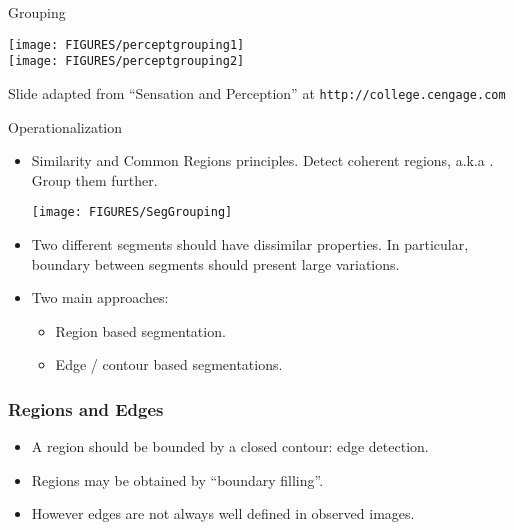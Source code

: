 \documentclass[9pt]{beamer}
\newcommand{\myemph}[1]{{\color{blue}{#1}}}
\begin{document}
\begin{frame}[t]{Grouping}
  \begin{center}
    \texttt{[image: FIGURES/perceptgrouping1]}\\
    \texttt{[image: FIGURES/perceptgrouping2]}\\
  \end{center}
  \vfill
  {\fontsize{6}{6}\selectfont Slide adapted from ``Sensation and Perception'' at \texttt{http://college.cengage.com}}
\end{frame}

\begin{frame}[t]{Operationalization}
  \begin{itemize}
  \item Similarity and Common Regions principles. Detect coherent regions, a.k.a \myemph{segments}. Group them further.
    \begin{center}
      \texttt{[image: FIGURES/SegGrouping]}
    \end{center}
  \item Two different segments should have dissimilar properties. In
    particular, boundary between segments should present large
    variations.\vfill
  \item Two main approaches: \vfill
    \begin{itemize}
    \item Region based segmentation. \vfill
    \item Edge / contour based segmentations.\vfill
    \end{itemize}
  \end{itemize}
\end{frame}




\begin{frame}
  \frametitle{Regions and Edges}
  \begin{itemize}
  \item A region should be bounded by a closed contour: edge
    detection.
  \item Regions may be obtained by ``boundary filling''.\vfill
  \item However edges are not always well defined in observed images. 
  \end{itemize}
  \pause
  \begin{center}
  \end{center}
\end{frame}
\end{document}
